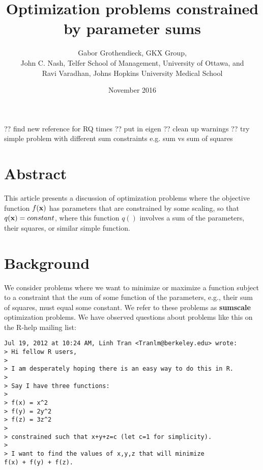 \documentclass[11pt]{article}\usepackage[]{graphicx}\usepackage[]{color}
\makeatletter
\newenvironment{kframe}{%
 \def\at@end@of@kframe{}%
 \ifinner\ifhmode%
  \def\at@end@of@kframe{\end{minipage}}%
  \begin{minipage}{\columnwidth}%
 \fi\fi%
 \def\FrameCommand##1{\hskip\@totalleftmargin \hskip-\fboxsep
 \colorbox{shadecolor}{##1}\hskip-\fboxsep
     \hskip-\linewidth \hskip-\@totalleftmargin \hskip\columnwidth}%
 \MakeFramed {\advance\hsize-\width
   \@totalleftmargin\z@ \linewidth\hsize
   \@setminipage}}%
 {\par\unskip\endMakeFramed%
 \at@end@of@kframe}
\newenvironment{knitrout}{}{} %
\newcommand{\B}[1]{{\bf #1 \rm}}
\makeatother
\begin{document}
?? find new reference for RQ times
?? put in eigen
?? clean up warnings
?? try simple problem with different sum constraints e.g. sum vs sum of squares


\begin{knitrout}
\color{fgcolor}\begin{kframe}


{\ttfamily\noindent\color{warningcolor}{\#\# Warning in parse\_objects(paths[1L]): file cache/\_\_objects not found}}

{\ttfamily\noindent\color{warningcolor}{\#\# Warning in parse\_objects(paths[2L]): file cache/\_\_globals not found}}\end{kframe}
\end{knitrout}


\title{Optimization problems constrained by parameter sums}
\author{Gabor Grothendieck, GKX Group,\\
John C. Nash, Telfer School of Management, University of Ottawa, and\\
Ravi Varadhan, Johns Hopkins University Medical School}
\date{November 2016}
\maketitle

\section*{Abstract}

This article presents a discussion of optimization problems where the 
objective function $f(\B{x})$ has parameters that are constrained by some
scaling, so that $q(\B{x}) = constant$, where this function $q()$ involves
a sum of the parameters, their squares, or similar simple function.

\section{Background}

We consider problems where we want to minimize or maximize a function subject to a constraint
that the sum of some function of the parameters, e.g., their sum of squares, must 
equal some constant.
We refer to these problems as \B{sumscale} optimization problems. We have observed questions 
about problems like this on the R-help mailing list: 

\begin{verbatim}
Jul 19, 2012 at 10:24 AM, Linh Tran <Tranlm@berkeley.edu> wrote:
> Hi fellow R users,
>
> I am desperately hoping there is an easy way to do this in R.
>
> Say I have three functions:
>
> f(x) = x^2
> f(y) = 2y^2
> f(z) = 3z^2
>
> constrained such that x+y+z=c (let c=1 for simplicity).
>
> I want to find the values of x,y,z that will minimize 
f(x) + f(y) + f(z).
\end{verbatim}
\end{document}
